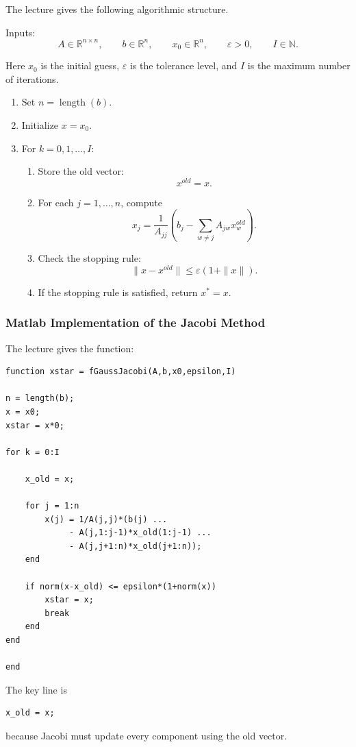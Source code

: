 \documentclass[10pt, letterpaper]{article}
\newcommand{\R}{\mathbb{R}}
\newcommand{\N}{\mathbb{N}}
\begin{document}
The lecture gives the following algorithmic structure.

Inputs:
\[
A\in\R^{n\times n},
\qquad
b\in\R^n,
\qquad
x_0\in\R^n,
\qquad
\varepsilon>0,
\qquad
I\in\N.
\]

Here \(x_0\) is the initial guess, \(\varepsilon\) is the tolerance level, and \(I\) is the maximum number of iterations.

\begin{enumerate}
    \item Set \(n=\operatorname{length}(b)\).
    \item Initialize \(x=x_0\).
    \item For \(k=0,1,\dots,I\):
    \begin{enumerate}
        \item Store the old vector:
        \[
        x^{old}=x.
        \]
        \item For each \(j=1,\dots,n\), compute
        \[
        x_j
        =
        \frac{1}{A_{jj}}
        \left(
        b_j-\sum_{w\neq j}A_{jw}x_w^{old}
        \right).
        \]
        \item Check the stopping rule:
        \[
        \|x-x^{old}\|
        \leq
        \varepsilon(1+\|x\|).
        \]
        \item If the stopping rule is satisfied, return \(x^\ast=x\).
    \end{enumerate}
\end{enumerate}

\subsubsection{Matlab Implementation of the Jacobi Method}

The lecture gives the function:
\begin{verbatim}
function xstar = fGaussJacobi(A,b,x0,epsilon,I)

n = length(b);
x = x0;
xstar = x*0;

for k = 0:I

    x_old = x;

    for j = 1:n
        x(j) = 1/A(j,j)*(b(j) ...
             - A(j,1:j-1)*x_old(1:j-1) ...
             - A(j,j+1:n)*x_old(j+1:n));
    end

    if norm(x-x_old) <= epsilon*(1+norm(x))
        xstar = x;
        break
    end
end

end
\end{verbatim}

The key line is
\begin{verbatim}
x_old = x;
\end{verbatim}
because Jacobi must update every component using the old vector.
\end{document}

